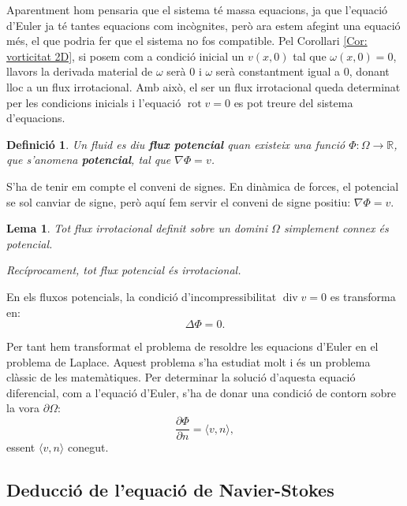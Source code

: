 \documentclass{article}
\numberwithin{equation}{section}
\DeclareMathOperator{\diver}{div}
\DeclareMathOperator{\rot}{rot}
\newtheorem{definicio}{Definici\'{o}}[section]
\newtheorem{lema}{Lema}[section]
\begin{document}
Aparentment hom pensaria que el sistema t\'{e} massa equacions, ja que l'equaci\'{o} d'Euler ja t\'{e} tantes equacions com inc\`{o}gnites, per\`{o} ara estem afegint una equaci\'{o} m\'{e}s, el que podria fer que el sistema no fos compatible. Pel Corol\textperiodcentered lari \ref{Cor: vorticitat 2D}, si posem com a condici\'{o} inicial un $v(x,0)$ tal que $\omega(x,0)=0$, llavors la derivada material de $\omega$ ser\`{a} $0$ i $\omega$ ser\`{a} constantment igual a $0$, donant lloc a un flux irrotacional. Amb aix\`{o}, el ser un flux irrotacional queda determinat per les condicions inicials i l'equaci\'{o} $\rot v=0$ es pot treure del sistema d'equacions.

\begin{definicio}
Un fluid es diu \textbf{flux potencial} quan existeix una funci\'{o} $\Phi:\Omega\rightarrow\mathbb{R}$, que s'anomena \textbf{potencial}, tal que $\nabla\Phi=v$.
\end{definicio}

S'ha de tenir em compte el conveni de signes. En din\`{a}mica de forces, el potencial se sol canviar de signe, per\`{o} aqu\'{i} fem servir el conveni de signe positiu: $\nabla\Phi=v$.

\begin{lema}
Tot flux irrotacional definit sobre un domini $\Omega$ simplement connex \'{e}s potencial.

Rec\'{i}procament, tot flux potencial \'{e}s irrotacional.
\end{lema}

En els fluxos potencials, la condici\'{o} d'incompressibilitat $\diver v=0$ es transforma en:
\begin{equation}
\Delta\Phi=0.
\end{equation}

Per tant hem transformat el problema de resoldre les equacions d'Euler en el problema de Laplace. Aquest problema s'ha estudiat molt i \'{e}s un problema cl\`{a}ssic de les matem\`{a}tiques. Per determinar la soluci\'{o} d'aquesta equaci\'{o} diferencial, com a l'equaci\'{o} d'Euler, s'ha de donar una condici\'{o} de contorn sobre la vora $\partial\Omega$:
\begin{equation}
\frac{\partial\Phi}{\partial n}=\langle v,n\rangle,
\end{equation}
essent $\langle v,n\rangle$ conegut.

\subsection{Deducci\'{o} de l'equaci\'{o} de Navier-Stokes}
\end{document}
